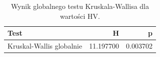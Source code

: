 \begin{table}
\caption{Wynik globalnego testu Kruskala-Wallisa dla wartości HV.}
\label{tab:kruskal_global}
\begin{tabular}{lrr}
\toprule
Test & H & p \\
\midrule
Kruskal-Wallis globalnie & 11.197700 & 0.003702 \\
\bottomrule
\end{tabular}
\end{table}
